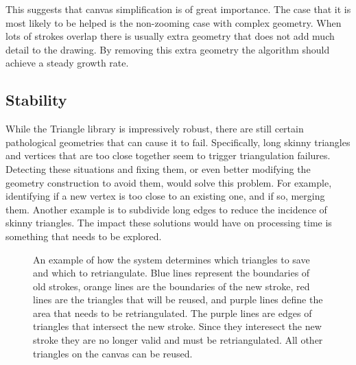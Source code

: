 \documentclass[review]{acmsiggraph}
\begin{document}
This suggests that canvas simplification is of great importance.
The case that it is most likely to be helped is the non-zooming case with complex geometry. When lots of strokes
overlap there is usually extra geometry that does not add much detail to the drawing. By removing
this extra geometry the algorithm should achieve a steady growth rate.

\subsection{Stability}
While the Triangle library is impressively robust, there are still certain pathological geometries that can cause it to fail.  Specifically, long skinny triangles and vertices that are too close together seem to trigger triangulation failures.  Detecting these situations and fixing them, or even better modifying the geometry construction to avoid them, would solve this problem.  For example, identifying if a new vertex is too close to an existing one, and if so, merging them.  Another example is to subdivide long edges to reduce the incidence of skinny triangles.  The impact these solutions would have on processing time is something that needs to be explored.

\begin{figure}
    \centering
    \caption{An example of how the system determines which triangles to save and which to retriangulate. Blue
    lines represent the boundaries of old strokes, orange lines are the boundaries of the new stroke, red lines are
    the triangles that will be reused, and purple lines define the area that needs to be retriangulated. The purple
    lines are edges of triangles that intersect the new stroke. Since they interesect the new stroke they are no
    longer valid and must be retriangulated. All other triangles on the canvas can be reused.}
    \label{fig:modified}
\end{figure}
\end{document}
